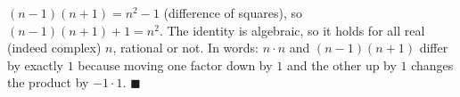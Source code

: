 $(n-1)(n+1)=n^2-1$ (difference of squares), so $(n-1)(n+1)+1=n^2$. The identity is algebraic, so it holds for all real (indeed complex) $n$, rational or not. In words: $n\cdot n$ and $(n-1)(n+1)$ differ by exactly $1$ because moving one factor down by $1$ and the other up by $1$ changes the product by $-1\cdot1$. $\blacksquare$
